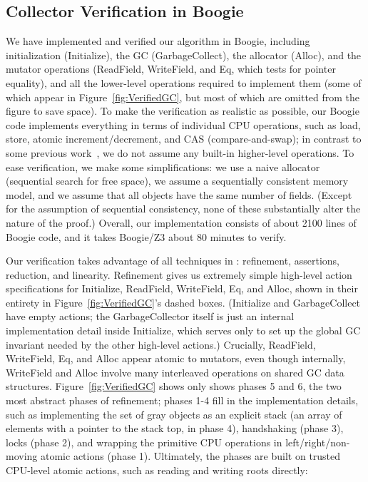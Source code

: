 \subsection{Collector Verification in Boogie}

We have implemented and verified our algorithm in Boogie,
including initialization (Initialize), the GC (GarbageCollect), the allocator (Alloc),
and the mutator operations (ReadField, WriteField, and Eq, which tests for pointer equality),
and all the lower-level operations required to implement them (some of which appear
in Figure~\ref{fig:VerifiedGC}, but most of which are omitted from the figure to save space).
To make the verification as realistic as possible,
our Boogie code implements everything in terms of individual CPU operations,
such as load, store, atomic increment/decrement, and CAS (compare-and-swap);
in contrast to some previous work~\cite{gont96},
we do not assume any built-in higher-level operations.
To ease verification, we make some simplifications:
we use a naive allocator (sequential search for free space),
we assume a sequentially consistent memory model,
and we assume that all objects have the same number of fields.
(Except for the assumption of sequential consistency, none of these substantially alter the nature of the proof.)
Overall, our implementation consists of about 2100 lines of Boogie code,
and it takes Boogie/Z3 about 80 minutes to verify.

Our verification takes advantage of all techniques in \civl: refinement, assertions, reduction, and linearity.
Refinement gives us extremely simple high-level action specifications for Initialize, ReadField, WriteField, Eq, and Alloc,
shown in their entirety in Figure~\ref{fig:VerifiedGC}'s dashed boxes.
(Initialize and GarbageCollect have empty actions; the GarbageCollector itself is just an internal implementation detail inside Initialize,
which serves only to set up the global GC invariant needed by the other high-level actions.)
Crucially, ReadField, WriteField, Eq, and Alloc appear atomic to mutators, even though internally,
WriteField and Alloc involve many interleaved operations on shared GC data structures.
Figure~\ref{fig:VerifiedGC} shows only shows phases 5 and 6, the two most abstract phases of refinement;
phases 1-4 fill in the implementation details,
such as implementing the set of gray objects as an explicit stack (an array of elements with a pointer to the stack top, in phase 4),
handshaking (phase 3), locks (phase 2), and wrapping the primitive CPU operations in left/right/non-moving atomic actions (phase 1).
Ultimately, the phases are built on trusted CPU-level atomic actions, such as reading and writing roots directly:

